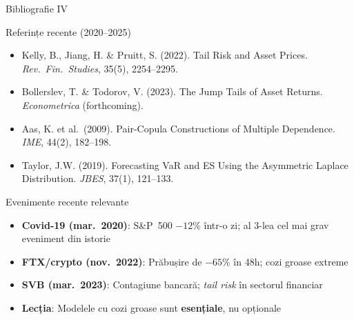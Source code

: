 \documentclass[9pt, aspectratio=169, t]{beamer}
\theoremstyle{definition}
\newenvironment{cminipage}[1]{%
    \par\noindent\hfill\begin{minipage}{#1}\ignorespaces
}{%
    \end{minipage}\hfill\null\par
}
\begin{document}
\begin{frame}{Bibliografie IV}
    \begin{cminipage}{0.95\textwidth}
    \begin{block}{Referințe recente (2020--2025)}
        {\footnotesize
        \begin{itemize}\setlength{\itemsep}{0pt}
            \item Kelly, B., Jiang, H. \& Pruitt, S. (2022). Tail Risk and Asset Prices. \textit{Rev.\ Fin.\ Studies}, 35(5), 2254--2295.
            \item Bollerslev, T. \& Todorov, V. (2023). The Jump Tails of Asset Returns. \textit{Econometrica} (forthcoming).
            \item Aas, K. et al.\ (2009). Pair-Copula Constructions of Multiple Dependence. \textit{IME}, 44(2), 182--198.
            \item Taylor, J.W. (2019). Forecasting VaR and ES Using the Asymmetric Laplace Distribution. \textit{JBES}, 37(1), 121--133.
        \end{itemize}
        }
    \end{block}

    \begin{exampleblock}{Evenimente recente relevante}
        {\footnotesize
        \begin{itemize}\setlength{\itemsep}{0pt}
            \item \textbf{Covid-19 (mar.\ 2020)}: S\&P~500 $-12\%$ într-o zi; al 3-lea cel mai grav eveniment din istorie
            \item \textbf{FTX/crypto (nov.\ 2022)}: Prăbușire de $-65\%$ în 48h; cozi groase extreme
            \item \textbf{SVB (mar.\ 2023)}: Contagiune bancară; \textit{tail risk} în sectorul financiar
            \item \textbf{Lecția}: Modelele cu cozi groase sunt \textbf{esențiale}, nu opționale
        \end{itemize}
        }
    \end{exampleblock}
    \end{cminipage}
\end{frame}
\end{document}
